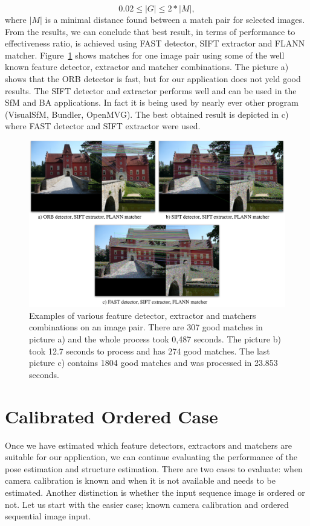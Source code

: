 \begin{equation}
	0.02 \leq |G| \leq 2* |M|,
\end{equation}
where $|M|$ is a minimal distance found between a match pair for selected images. From the results, we can conclude that best result, in terms of performance to effectiveness ratio, is achieved using FAST detector, SIFT extractor and FLANN matcher. Figure~\ref{fig:matches} shows matches for one image pair using some of the well known feature detector, extractor and matcher combinations. The picture a) shows that the ORB detector is fast, but for our application does not yeld good results. The SIFT detector and extractor performs well and can be used in the SfM and BA applications. In fact it is being used by nearly ever other program (VisualSfM, Bundler, OpenMVG). The best obtained result is depicted in c) where FAST detector and SIFT extractor were used.

\begin{figure}[!htbp]
	\begin{center}
		\includegraphics[keepaspectratio,width=\textwidth]{fig/matches.pdf}
	\end{center}
	\caption{Examples of various feature detector, extractor and matchers combinations on an image pair. There are 307 good matches in picture a) and the whole process took 0,487 seconds. The picture b) took 12.7 seconds to process and has 274 good matches. The last picture c) contains 1804 good matches and was processed in 23.853 seconds.}
	\label{fig:matches}
\end{figure}

\newpage
\section{Calibrated Ordered Case}
\label{sec:experiments-calibrated}
Once we have estimated which feature detectors, extractors and matchers are suitable for our application, we can continue evaluating the performance of the pose estimation and structure estimation. There are two cases to evaluate: when camera calibration is known and when it is not available and needs to be estimated.  Another distinction is whether the input sequence image is ordered or not. Let us start with the easier case; known camera calibration and ordered sequential image input.

